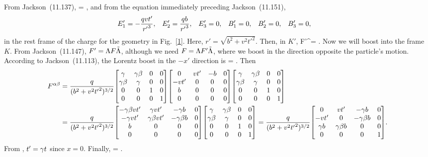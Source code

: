 \newcommand{\Fmat}{\mqty[	0 & -\Eq & -\Ew & -\Ee \\
						\Eq & 0 & -\Be & \Bw \\
						\Ew & \Be & 0 & -\Bq \\
						\Ee & -\Bw & \Bq & 0 ]}
\newcommand{\Fpab}{{F'}^{\alp\bet}}
\newcommand{\rp}{{r'}}
\newcommand{\tLam}{\tilde{\Lam}}
\newcommand{\Lammat}{\mqty[\gam & \gam \beta & 0 & 0 \\	
						\gam \beta & \gam & 0 & 0 \\
						0 & 0 & 1 & 0 \\
						0 & 0 & 0 & 1 ]}

\begin{solution}
	From Jackson~(11.137),
	\beqn \label{F}
		\Fab = \Fmat,
	\eeqn
	and from the equation immediately preceding Jackson~(11.151),
	\begin{align*}
		\Eq' &= -\frac{q v t'}{\rp^3}, &
		\Ew' &= \frac{q b}{\rp^3}, &
		\Ee' &= 0, &
		\Bq' &= 0, &
		\Bw' &= 0, &
		\Be' &= 0,
	\end{align*}
	in the rest frame of the charge for the geometry in Fig.~\ref{1}.  Here, $r' = \sqrt{b^2 + v^2 {t'}^2}$.  Then, in $K'$,
	\beqn \label{thing2.1b}
		\Fpab = 
			\mqty[0 & v t' & -b & 0 \\
				-v t' & 0 & 0 & 0 \\
				b & 0 & 0 & 0 \\
				0 & 0 & 0 & 0 ].
	\eeqn
	Now we will boost into the frame $K$.  From Jackson~(11.147), $F' = \Lam F \tLam$, although we need $F = \Lam F' \tLam$, where we boost in the direction opposite the particle's motion.  According to Jackson~(11.113), the Lorentz boost in the $-x'$ direction is
	\beqn \label{Lam2}
		\Lam = \Lammat.
	\eeqn
	Then
	\begin{align*}
		\Fab &= \frac{q}{(b^2 + v^2 {t'}^2)^{3/2}} \Lammat
			\mqty[ 0 & v t' & -b & 0 \\
				-v t' & 0 & 0 & 0 \\
				b & 0 & 0 & 0 \\
				0 & 0 & 0 & 0 ]
			\Lammat \\
		&= \frac{q}{(b^2 + v^2 {t'}^2)^{3/2}}
			\mqty[ -\gam \bet v t' & \gam v t' & -\gam b & 0 \\
				-\gam v t' & \gam \bet v t' & -\gam \bet b & 0 \\
				b & 0 & 0 & 0 \\
				0 & 0 & 0 & 0 ]
			\Lammat
		= \frac{q}{(b^2 + v^2 {t'}^2)^{3/2}}
			\mqty[ 0 & v t' & -\gam b & 0 \\
				-v t' & 0 & -\gam \bet b & 0 \\
				\gam b & \gam \bet b & 0 & 0 \\
				0 & 0 & 0 & 1 ].
	\end{align*}
	From , $t' = \gamma t$ since $x = 0$.  Finally,
	\beqn \label{thing2.1}
		\Fab =  
			\mqty[0 & v t & -b & 0 \\
				-v t & 0 & -v b / c & 0 \\
				b & v b / c & 0 & 0 \\
				0 & 0 & 0 & 0 ].
	\eeqn
	

\end{solution}
